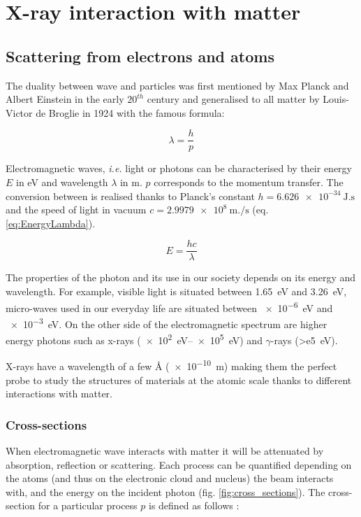 \section{X-ray interaction with matter} \label{sec:XRIntMatter}

\subsection{Scattering from electrons and atoms}

The duality between wave and particles was first mentioned by Max Planck and Albert Einstein in the early $20^{th}$ century and generalised to all matter by Louis-Victor de Broglie in 1924 with the famous formula:

\begin{equation}
	\lambda = \frac{h}{p}
\end{equation}

Electromagnetic waves, \textit{i.e.} light or photons can be characterised by their energy $E$ in \unit{\eV} and wavelength $\lambda$ in \unit{\meter}. $p$ corresponds to the momentum transfer.
The conversion between is realised thanks to Planck's constant $h = \qty{6.626e-34}{\joule.\second}$ and the speed of light in vacuum $c = \qty{2.9979e8}{\meter.\per \second}$ (eq. \ref{eq:EnergyLambda}).

\begin{equation}
    \label{eq:EnergyLambda}
	E = \frac{hc}{\lambda}
\end{equation}

The properties of the photon and its use in our society depends on its energy and wavelength.
For example, visible light is situated between \qty{1.65}{\eV} and \qty{3.26}{\eV}, micro-waves used in our everyday life are situated between \qty{e-6}{\eV} and \qty{e-3}{\eV}.
On the other side of the electromagnetic spectrum are higher energy photons such as x-rays (\qtyrange{e2}{e5}{\eV}) and $\gamma$-rays (\qty{>e5}{\eV}).

X-rays have a wavelength of a few \unit{\angstrom} (\qty{e-10}{\m}) making them the perfect probe to study the structures of materials at the atomic scale thanks to different interactions with matter.

\subsubsection{Cross-sections}

When electromagnetic wave interacts with matter it will be attenuated by absorption, reflection or scattering.
Each process can be quantified depending on the atoms (and thus on the electronic cloud and nucleus) the beam interacts with, and the energy on the incident photon (fig. \ref{fig:cross_sections}).
The cross-section for a particular process $p$ is defined as follows \parencite{Willmott}:

